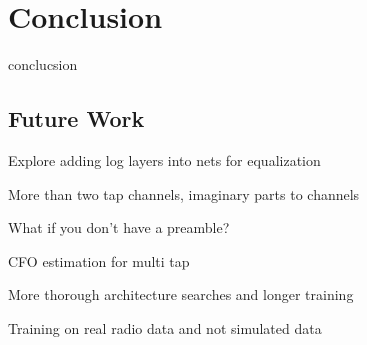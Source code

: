 \chapter{Conclusion}

conclucsion


\section{Future Work}

Explore adding log layers into nets for equalization

More than two tap channels, imaginary parts to channels

What if you don't have a preamble?

CFO estimation for multi tap

More thorough architecture searches and longer training

Training on real radio data and not simulated data